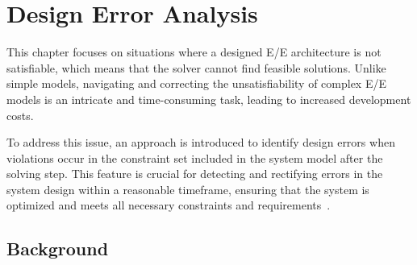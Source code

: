 \newpage
\chapter{Design Error Analysis}\label{designerror}

    
    This chapter focuses on situations where a designed E/E architecture is not satisfiable, which means that the solver cannot find feasible solutions. Unlike simple models, navigating and correcting the unsatisfiability of complex E/E models is an intricate and time-consuming task, leading to increased development costs.
    
    To address this issue, an approach is introduced to identify design errors when violations occur in the constraint set included in the system model after the solving step. This feature is crucial for detecting and rectifying errors in the system design within a reasonable timeframe, ensuring that the system is optimized and meets all necessary constraints and requirements~\cite{askaripoor2023designer,askaripoor2022architecture,9613692}.
    
    
    \section{Background}
    
